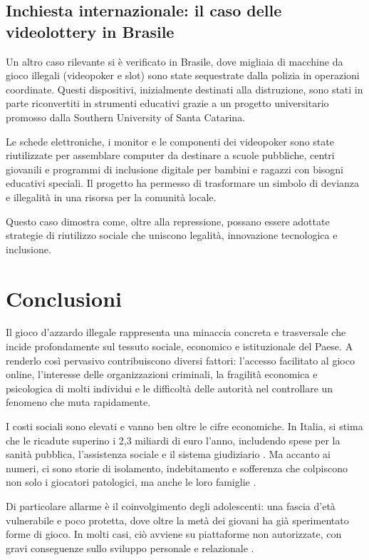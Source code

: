 \documentclass[a4paper,12pt]{article}
\begin{document}
\subsection{Inchiesta internazionale: il caso delle videolottery in Brasile}

Un altro caso rilevante si è verificato in Brasile, dove migliaia di macchine da gioco illegali (videopoker e slot) sono state sequestrate dalla polizia in operazioni coordinate. Questi dispositivi, inizialmente destinati alla distruzione, sono stati in parte riconvertiti in strumenti educativi grazie a un progetto universitario promosso dalla Southern University of Santa Catarina.

Le schede elettroniche, i monitor e le componenti dei videopoker sono state riutilizzate per assemblare computer da destinare a scuole pubbliche, centri giovanili e programmi di inclusione digitale per bambini e ragazzi con bisogni educativi speciali. Il progetto ha permesso di trasformare un simbolo di devianza e illegalità in una risorsa per la comunità locale.
\cite{bento2010cheating}

Questo caso dimostra come, oltre alla repressione, possano essere adottate strategie di riutilizzo sociale che uniscono legalità, innovazione tecnologica e inclusione.

\section{Conclusioni}

Il gioco d’azzardo illegale rappresenta una minaccia concreta e trasversale che incide profondamente sul tessuto sociale, economico e istituzionale del Paese. A renderlo così pervasivo contribuiscono diversi fattori: l’accesso facilitato al gioco online, l’interesse delle organizzazioni criminali, la fragilità economica e psicologica di molti individui e le difficoltà delle autorità nel controllare un fenomeno che muta rapidamente.

I costi sociali sono elevati e vanno ben oltre le cifre economiche. In Italia, si stima che le ricadute superino i 2,3 miliardi di euro l’anno, includendo spese per la sanità pubblica, l’assistenza sociale e il sistema giudiziario \cite{lucchini2022socialcosts}. Ma accanto ai numeri, ci sono storie di isolamento, indebitamento e sofferenza che colpiscono non solo i giocatori patologici, ma anche le loro famiglie \cite{gorsane2017illegalacts}.

Di particolare allarme è il coinvolgimento degli adolescenti: una fascia d’età vulnerabile e poco protetta, dove oltre la metà dei giovani ha già sperimentato forme di gioco. In molti casi, ciò avviene su piattaforme non autorizzate, con gravi conseguenze sullo sviluppo personale e relazionale \cite{gori2014adolescentgambling}.
\end{document}
